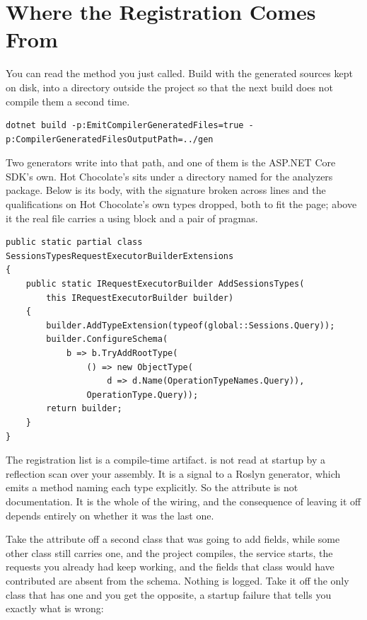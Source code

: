\section{Where the Registration Comes From}
\label{sec:ch02-where-the-registration-comes-from}

%
You can read the method you just called. Build with the generated sources kept
on disk, into a directory outside the project so that the next build does not
compile them a second time.

\begin{verbatim}
dotnet build -p:EmitCompilerGeneratedFiles=true -p:CompilerGeneratedFilesOutputPath=../gen
\end{verbatim}

Two generators write into that path, and one of them is the ASP.NET Core SDK's
own. Hot Chocolate's sits under a directory named for the analyzers package.
Below is its body, with the signature broken across lines and the
 qualifications on Hot Chocolate's own types dropped, both to
fit the page; above it the real file carries a using block and a pair of
pragmas.

\begin{verbatim}
public static partial class SessionsTypesRequestExecutorBuilderExtensions
{
    public static IRequestExecutorBuilder AddSessionsTypes(
        this IRequestExecutorBuilder builder)
    {
        builder.AddTypeExtension(typeof(global::Sessions.Query));
        builder.ConfigureSchema(
            b => b.TryAddRootType(
                () => new ObjectType(
                    d => d.Name(OperationTypeNames.Query)),
                OperationType.Query));
        return builder;
    }
}
\end{verbatim}

%
The registration list is a compile-time artifact. \code{[QueryType]} is not
read at startup by a reflection scan over your assembly. It is a signal to a
Roslyn generator, which emits a method naming each type explicitly. So the
attribute is not documentation. It is the whole of the wiring, and the
consequence of leaving it off depends entirely on whether it was the last one.

Take the attribute off a second class that was going to add fields, while some
other class still carries one, and the project compiles, the service starts,
the requests you already had keep working, and the fields that class would have
contributed are absent from the schema. Nothing is logged. Take it off the only
class that has one and you get the opposite, a startup failure that tells you
exactly what is wrong:

